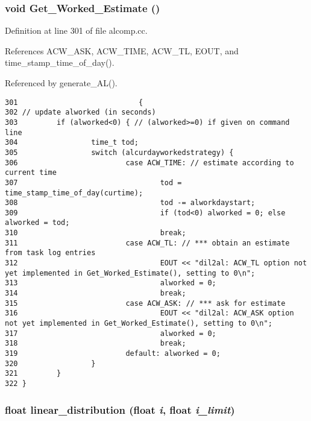 \subsubsection{\setlength{\rightskip}{0pt plus 5cm}void Get\_\-Worked\_\-Estimate ()}\label{alcomp_8cc_a11}




Definition at line 301 of file alcomp.cc.

References ACW\_\-ASK, ACW\_\-TIME, ACW\_\-TL, EOUT, and time\_\-stamp\_\-time\_\-of\_\-day().

Referenced by generate\_\-AL().



\footnotesize\begin{verbatim}301                            {
302 // update alworked (in seconds)
303         if (alworked<0) { // (alworked>=0) if given on command line
304                 time_t tod;
305                 switch (alcurdayworkedstrategy) {
306                         case ACW_TIME: // estimate according to current time
307                                 tod = time_stamp_time_of_day(curtime);
308                                 tod -= alworkdaystart;
309                                 if (tod<0) alworked = 0; else alworked = tod;
310                                 break;
311                         case ACW_TL: // *** obtain an estimate from task log entries
312                                 EOUT << "dil2al: ACW_TL option not yet implemented in Get_Worked_Estimate(), setting to 0\n";
313                                 alworked = 0;
314                                 break;
315                         case ACW_ASK: // *** ask for estimate
316                                 EOUT << "dil2al: ACW_ASK option not yet implemented in Get_Worked_Estimate(), setting to 0\n";
317                                 alworked = 0;
318                                 break;
319                         default: alworked = 0;
320                 }
321         }
322 }
\end{verbatim}\normalsize 
{}
\subsubsection{\setlength{\rightskip}{0pt plus 5cm}float linear\_\-distribution (float {\em i}, float {\em i\_\-limit})}\label{alcomp_8cc_a9}




